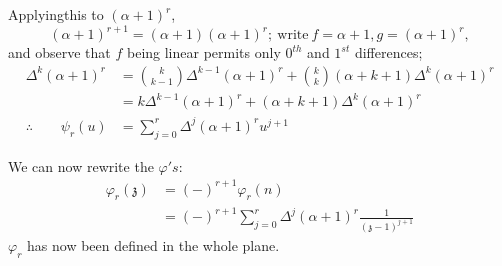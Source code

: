 Applying\pageoriginale this to $(\alpha+1)^r$,
$$
(\alpha+1)^{r+1}= (\alpha+1)(\alpha+1)^r; ~\text{write}~ f= \alpha+1,
g= (\alpha+1)^r,
$$
and observe that $f$ being linear permits only $0^{th}$ and $1^{st}$
differences; 
\begin{align*}
  \Delta^k (\alpha+1)^r & = \binom{k}{k-1} \Delta^{k-1} (\alpha+1)^r+
  \binom{k}{k} (\alpha+k+1) \Delta^k (\alpha+1)^r\\
  & = k \Delta^{k-1} (\alpha+1)^r + (\alpha+k+1) \Delta^k (\alpha+1)^r
  \\
  \therefore \qquad \psi_r (u) & = \sum^r_{j=0} \Delta^j (\alpha+1)^r
  u^{j+1} 
\end{align*}

We can now rewrite the $\varphi's$:
\begin{align*}
  \varphi_r (\mathfrak{z}) & = (-)^{r+1} \varphi_r (n)\\
  & = (-)^{r+1} \sum^{r}_{j=0} \Delta^j (\alpha+1)^r
  \frac{1}{(\mathfrak{z}-1)^{j+1}}
\end{align*}
$\varphi_r$ has now been defined in the whole plane.
